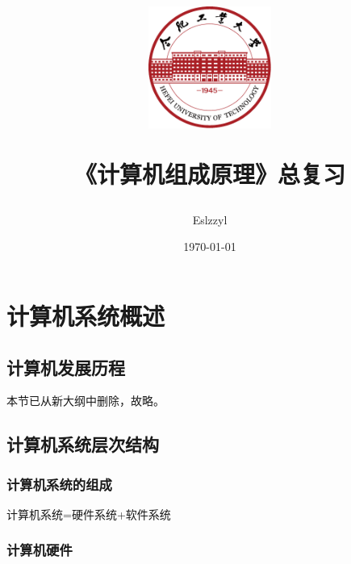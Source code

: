 \documentclass[12pt, a4paper, oneside]{ctexart}
\title{
    \includegraphics[width=0.3\textwidth]{../../share/images/hfut-badge.pdf}
    
    \vspace{20pt}
    《计算机组成原理》总复习
}
\author{Eslzzyl}
\date{\today}
\begin{document}
\maketitle
\newpage
\tableofcontents
\vspace{20pt}

\newpage

\section{计算机系统概述}

\subsection{计算机发展历程}

本节已从新大纲中删除，故略。

\subsection{计算机系统层次结构}

\subsubsection{计算机系统的组成}

计算机系统=硬件系统+软件系统

\subsubsection{计算机硬件}
\end{document}

